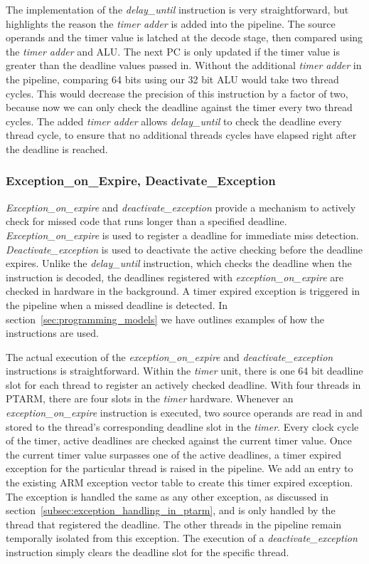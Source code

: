 The implementation of the \emph{delay\_until} instruction is very straightforward, but highlights the reason the \emph{timer adder} is added into the pipeline.
The source operands and the timer value is latched at the decode stage, then compared using the \emph{timer adder} and ALU. 
The next PC is only updated if the timer value is greater than the deadline values passed in.  
Without the additional \emph{timer adder} in the pipeline, comparing 64 bits using our 32 bit ALU would take two thread cycles. 
This would decrease the precision of this instruction by a factor of two, because now we can only check the deadline against the timer every two thread cycles.
The added \emph{timer adder} allows \emph{delay\_until} to check the deadline every thread cycle, to ensure that no additional threads cycles have elapsed right after the deadline is reached. 

\subsubsection{Exception\_on\_Expire, Deactivate\_Exception}    
\emph{Exception\_on\_expire} and \emph{deactivate\_exception} provide a mechanism to actively check for missed code that runs longer than a specified deadline.  
\emph{Exception\_on\_expire} is used to register a deadline for immediate miss detection. 
\emph{Deactivate\_exception} is used to deactivate the active checking before the deadline expires.   
Unlike the \emph{delay\_until} instruction, which checks the deadline when the instruction is decoded, the deadlines registered with \emph{exception\_on\_expire} are checked in hardware in the background. 
A timer expired exception is triggered in the pipeline when a missed deadline is detected.
In section~\ref{sec:programming_models} we have outlines examples of how the instructions are used.

The actual execution of the \emph{exception\_on\_expire} and \emph{deactivate\_exception} instructions is straightforward.    
Within the \emph{timer} unit, there is one 64 bit deadline slot for each thread to register an actively checked deadline.
With four threads in PTARM, there are four slots in the \emph{timer} hardware. 
Whenever an \emph{exception\_on\_expire} instruction is executed, two source operands are read in and stored to the thread's corresponding deadline slot in the \emph{timer}. 
Every clock cycle of the timer, active deadlines are checked against the current timer value.
Once the current timer value surpasses one of the active deadlines, a timer expired exception for the particular thread is raised in the pipeline.
We add an entry to the existing ARM exception vector table to create this timer expired exception. 
The exception is handled the same as any other exception, as discussed in section~\ref{subsec:exception_handling_in_ptarm}, and is only handled by the thread that registered the deadline. 
The other threads in the pipeline remain temporally isolated from this exception.
The execution of a \emph{deactivate\_exception} instruction simply clears the deadline slot for the specific thread.

